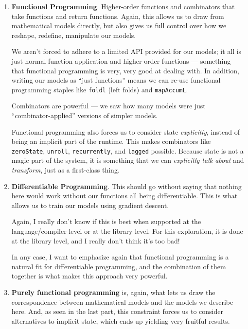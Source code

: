 \documentclass[]{article}
\begin{document}
\begin{enumerate}
\def\labelenumi{\arabic{enumi}.}
\item
  \textbf{Functional Programming}. Higher-order functions and combinators that
  take functions and return functions. Again, this allows us to draw from
  mathematical models directly, but also gives us full control over how we
  reshape, redefine, manipulate our models.

  We aren't forced to adhere to a limited API provided for our models; it all is
  just normal function application and higher-order functions --- something that
  functional programming is very, very good at dealing with. In addition,
  writing our models as ``just functions'' means we can re-use functional
  programming staples like \texttt{foldl} (left folds) and \texttt{mapAccumL}.

  Combinators are powerful --- we saw how many models were just
  ``combinator-applied'' versions of simpler models.

  Functional programming also forces us to consider state \emph{explicitly},
  instead of being an implicit part of the runtime. This makes combinators like
  \texttt{zeroState}, \texttt{unroll}, \texttt{recurrently}, and \texttt{lagged}
  possible. Because state is not a magic part of the system, it is something
  that we can \emph{explicitly talk about} and \emph{transform}, just as a
  first-class thing.
\item
  \textbf{Differentiable Programming}. This should go without saying that
  nothing here would work without our functions all being differentiable. This
  is what allows us to train our models using gradient descent.

  Again, I really don't know if this is best when supported at the
  language/compiler level or at the library level. For this exploration, it is
  done at the library level, and I really don't think it's too bad!

  In any case, I want to emphasize again that functional programming is a
  natural fit for differentiable programming, and the combination of them
  together is what makes this approach very powerful.
\item
  \textbf{Purely functional programming} is, again, what lets us draw the
  correspondence between mathematical models and the models we describe here.
  And, as seen in the last part, this constraint forces us to consider
  alternatives to implicit state, which ends up yielding very fruitful results.


\end{enumerate}
\end{document}
